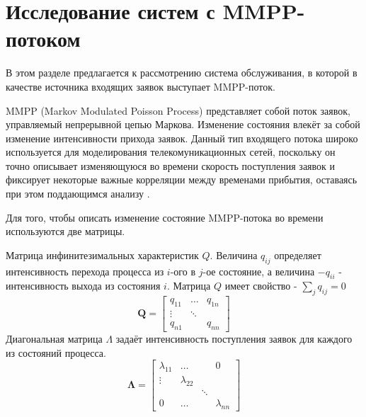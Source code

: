 \section {Исследование систем с MMPP-потоком} \label{mmpp_section}
В этом разделе предлагается к рассмотрению система обслуживания, в которой в качестве источника входящих заявок выступает MMPP-поток.

MMPP (Markov Modulated Poisson Process) представляет собой поток заявок, управляемый непрерывной цепью Маркова. Изменение состояния влекёт за собой изменение интенсивности прихода заявок. Данный тип входящего потока широко используется для моделирования телекомуникационных сетей, поскольку он точно описывает изменяющуюся во времени скорость поступления заявок и фиксирует некоторые важные корреляции между временами прибытия, оставаясь при этом поддающимся анализу \cite{fischer1993markov}.
 


Для того, чтобы описать изменение состояние MMPP-потока во времени используются две матрицы.

Матрица инфинитезимальных характеристик $Q$. Величина $q_{ij}$ определяет интенсивность перехода процесса из $i$-ого в $j$-ое состояние, а величина $-q_{ii}$ - интенсивность выхода из состояния $i$.
Матрица $Q$ имеет свойство - $\sum_{j}q_{ij} = 0$
\begin{equation*}
	\boldsymbol{Q}=\begin{bmatrix}
		q_{11} &  \dots &  q_{1n}\\
		\vdots & \ddots &  \\
		q_{n1} &    	&	q_{nn}
	\end{bmatrix}
\end{equation*}
Диагональная матрица $\Lambda$ задаёт интенсивность поступления заявок для каждого из состояний процесса.
\begin{equation*}
	\boldsymbol{\Lambda}=\begin{bmatrix}
		\lambda_{11}&	\dots	&   	 & 0\\
		\vdots 		&\lambda_{22}&  	 &   \\
		       		&    		& \ddots &   \\
		0  			&   \dots 	&		 & \lambda_{nn}
	\end{bmatrix}
\end{equation*}

